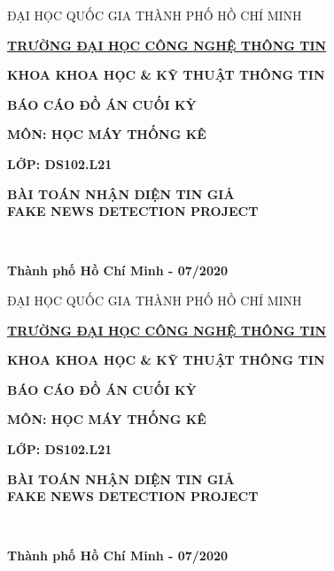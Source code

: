 \documentclass[12pt,a4paper,oneside]{book}
\begin{document}
\fontsize{14pt}{25pt}\selectfont %
\setlength{\baselineskip}{26truept}
{}
\pagestyle{empty}
\begin{titlepage}
	\centerline{ĐẠI HỌC QUỐC GIA THÀNH PHỐ HỒ CHÍ MINH}
	\centerline{\bf\underline{TRƯỜNG ĐẠI HỌC CÔNG NGHỆ THÔNG TIN}}
	\centerline{\bf KHOA KHOA HỌC \& KỸ THUẬT THÔNG TIN}
	\vspace{3.0cm}
	\centerline{\bf\fontsize{20pt}{16}\selectfont BÁO CÁO ĐỒ ÁN CUỐI KỲ}
	\centerline{\bf\fontsize{14.5pt}{16}\selectfont MÔN: HỌC MÁY THỐNG KÊ}
	\centerline{\bf\fontsize{14.5pt}{16}\selectfont LỚP: DS102.L21}
	\vspace{2.5cm}
	\begin{center}{\bf\fontsize{20pt}{28}\selectfont BÀI TOÁN NHẬN DIỆN TIN GIẢ \\FAKE NEWS DETECTION PROJECT}
	\end{center}
	\vspace{2cm}
	\\ 
	\vfill
	\centerline{\bf Thành phố Hồ Chí Minh - 07/2020}
\end{titlepage}
\newpage

\begin{titlepage}
	\centerline{ĐẠI HỌC QUỐC GIA THÀNH PHỐ HỒ CHÍ MINH}
	\centerline{\bf\underline{TRƯỜNG ĐẠI HỌC CÔNG NGHỆ THÔNG TIN}}
	\centerline{\bf KHOA KHOA HỌC \& KỸ THUẬT THÔNG TIN}
	\vspace*{3.0cm}
	\centerline{\bf\fontsize{20pt}{16}\selectfont BÁO CÁO ĐỒ ÁN CUỐI KỲ}
	\centerline{\bf\fontsize{14.5pt}{16}\selectfont MÔN: HỌC MÁY THỐNG KÊ}
	\centerline{\bf\fontsize{14.5pt}{16}\selectfont LỚP: DS102.L21}
	\vspace*{2.5cm}
	\begin{center}{\bf\fontsize{20pt}{28}\selectfont BÀI TOÁN NHẬN DIỆN TIN GIẢ\\ FAKE NEWS DETECTION PROJECT}\\
	\end{center}
	\vspace{2cm}
	\\ 
	\vfill
	\centerline{\bf Thành phố Hồ Chí Minh - 07/2020}
\end{titlepage}
\end{document}
